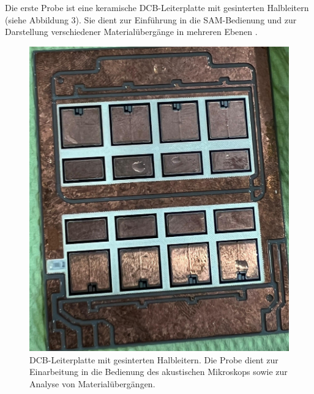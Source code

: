 Die erste Probe ist eine keramische DCB-Leiterplatte mit gesinterten Halbleitern (siehe Abbildung 3). Sie dient zur Einführung in die SAM-Bedienung und zur Darstellung verschiedener Materialübergänge in mehreren Ebenen .
\begin{figure}[H]
    \centering
    \includegraphics[scale=0.12]{Bilder/probe1}
    \caption{DCB-Leiterplatte mit gesinterten Halbleitern. Die Probe dient zur Einarbeitung in die Bedienung des akustischen Mikroskops sowie zur Analyse von Materialübergängen.}
    
    \vspace{0.2cm}
    \label{Abb.3: DCB-Leiterplatte mit gesinterten Halbleitern. Die Probe dient zur Einarbeitung in die Bedienung des akustischen Mikroskops sowie zur Analyse von Materialübergängen. }
\end{figure} 
\vspace{0.2cm}

